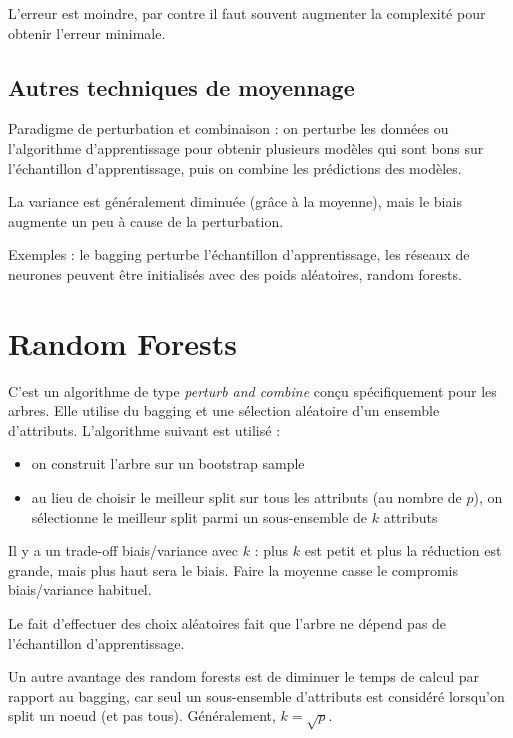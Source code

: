 	
	L'erreur est moindre, par contre il faut souvent augmenter la complexité pour obtenir l'erreur minimale.
	
	\subsection{Autres techniques de moyennage}
	
	Paradigme de perturbation et combinaison : on perturbe les données ou l'algorithme d'apprentissage pour obtenir plusieurs modèles qui sont bons sur l'échantillon d'apprentissage, puis on combine les prédictions des modèles.
	
	La variance est généralement diminuée (grâce à la moyenne), mais le biais augmente un peu à cause de la perturbation.
	
	Exemples : le bagging perturbe l'échantillon d'apprentissage, les réseaux de neurones peuvent être initialisés avec des poids aléatoires, random forests.
	
\section{Random Forests}

	C'est un algorithme de type \textit{perturb and combine} conçu spécifiquement pour les arbres. Elle utilise du bagging et une sélection aléatoire d'un ensemble d'attributs. L'algorithme suivant est utilisé :
	
	\begin{itemize}
		\item on construit l'arbre sur un bootstrap sample
		\item au lieu de choisir le meilleur split sur tous les attributs (au nombre de $p$), on sélectionne le meilleur split parmi un sous-ensemble de $k$ attributs
	\end{itemize}
	
	Il y a un trade-off biais/variance avec $k$ : plus $k$ est petit et plus la réduction est grande, mais plus haut sera le biais. Faire la moyenne casse le compromis biais/variance habituel.
	
	Le fait d'effectuer des choix aléatoires fait que l'arbre ne dépend pas de l'échantillon d'apprentissage.
	
	
	Un autre avantage des random forests est de diminuer le temps de calcul par rapport au bagging, car seul un sous-ensemble d'attributs est considéré lorsqu'on split un noeud (et pas tous). Généralement, $k = \sqrt{p}$.
	
